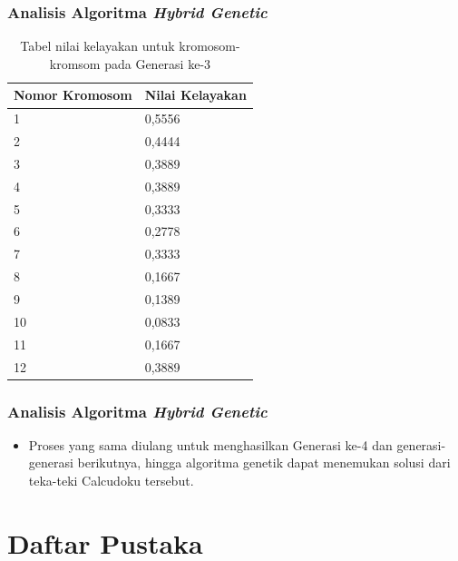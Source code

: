 \documentclass{beamer}
\begin{document}
\begin{frame}
\frametitle{Analisis Algoritma \textit{Hybrid Genetic}}
\begin{table}
\centering
\captionsetup{justification=centering}
\begin{tabular}{| l | l |}
\hline
Nomor Kromosom & Nilai Kelayakan \\
\hline \hline
1 & 0,5556 \\
\hline
2 & 0,4444 \\
\hline
3 & 0,3889 \\
\hline
4 & 0,3889 \\
\hline
5 & 0,3333 \\
\hline
6 & 0,2778 \\
\hline
7 & 0,3333 \\
\hline
8 & 0,1667 \\
\hline
9 & 0,1389 \\
\hline
10 & 0,0833 \\
\hline
11 & 0,1667 \\
\hline
12 & 0,3889 \\
\hline
\end{tabular}
\caption[Tabel nilai kelayakan untuk kromosom-kromsom pada Generasi ke-3]{Tabel nilai kelayakan untuk kromosom-kromsom pada Generasi ke-3}
\label{tab:analisishg4}
\end{table}\end{frame}

\note{

}

\begin{frame}
\frametitle{Analisis Algoritma \textit{Hybrid Genetic}}
\begin{itemize}
\item Proses yang sama diulang untuk menghasilkan Generasi ke-4 dan generasi-generasi berikutnya, hingga algoritma genetik dapat menemukan solusi dari teka-teki Calcudoku tersebut.
\end{itemize}
\end{frame}


\section{Daftar Pustaka}
\end{document}
